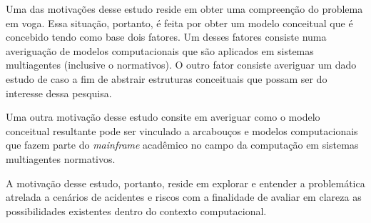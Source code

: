 Uma das motivações desse estudo reside em obter uma compreenção do problema em voga. Essa situação, portanto, é feita por obter um modelo conceitual que é concebido tendo como base dois fatores. Um desses fatores consiste numa averiguação de modelos computacionais que são aplicados em sistemas multiagentes (inclusive o normativos). O outro fator consiste averiguar um dado estudo de caso a fim de abstrair estruturas conceituais que possam ser do interesse dessa pesquisa.

Uma outra motivação desse estudo consite em averiguar como o modelo conceitual resultante pode ser vinculado a arcabouços e modelos computacionais que fazem parte do \textit{mainframe} acadêmico no campo da computação em sistemas multiagentes normativos.    

A motivação desse estudo, portanto, reside em explorar e entender a problemática atrelada a cenários de acidentes e riscos com a finalidade de avaliar em clareza as possibilidades existentes dentro do contexto computacional.